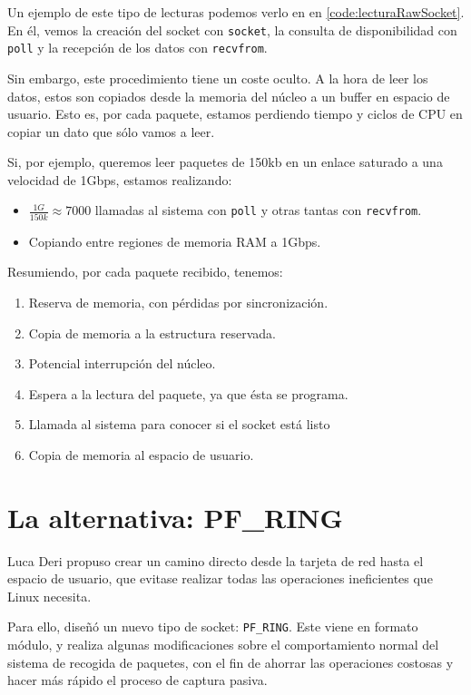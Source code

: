 Un ejemplo de este tipo de lecturas podemos verlo en en \lstlistingname{} \ref{code:lecturaRawSocket}. En él, vemos la 
creación del socket con \texttt{socket}, la consulta de disponibilidad con \texttt{poll} y la recepción de los datos 
con \texttt{recvfrom}.

Sin embargo, este procedimiento tiene un coste oculto. A la hora de leer los datos, estos son copiados desde la 
memoria del núcleo a un buffer en espacio de usuario. Esto es, por cada paquete, estamos perdiendo tiempo y ciclos de 
CPU en copiar un dato que sólo vamos a leer.

Si, por ejemplo, queremos leer paquetes de 150kb en un enlace saturado a una velocidad de 1Gbps, estamos realizando:
\begin{itemize}
 \item $\frac{1G}{150k} \approx 7000$ llamadas al sistema con \texttt{poll} y otras tantas con \texttt{recvfrom}.
 \item Copiando entre regiones de memoria RAM a 1Gbps.
\end{itemize}

Resumiendo, por cada paquete recibido, tenemos:
\begin{enumerate}
 \item Reserva de memoria, con pérdidas por sincronización.
 \item Copia de memoria a la estructura reservada.
 \item Potencial interrupción del núcleo.
 \item Espera a la lectura del paquete, ya que ésta se programa.
 \item Llamada al sistema para conocer si el socket está listo
 \item Copia de memoria al espacio de usuario.
\end{enumerate}

\section{La alternativa: PF\_RING}
Luca Deri propuso crear un camino directo desde la tarjeta de red hasta el espacio de usuario, que evitase realizar 
todas las operaciones ineficientes que Linux necesita.

Para ello, diseñó un nuevo tipo de socket: \texttt{PF\_RING}. Este viene en formato módulo, y realiza algunas 
modificaciones sobre el comportamiento normal del sistema de recogida de paquetes, con el fin de ahorrar las 
operaciones costosas y hacer más rápido el proceso de captura pasiva.

